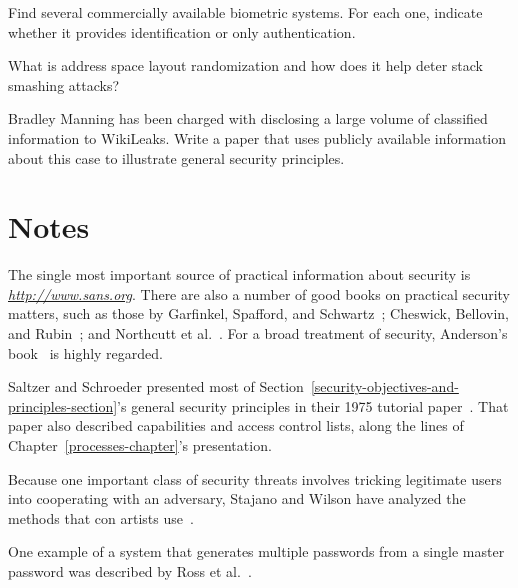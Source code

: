 \begin{chapterEnumerate}
\item
Find several commercially available biometric systems.  For each one, indicate whether it provides identification or only authentication.

\item
What is address space layout randomization and how does it help deter stack smashing attacks?

\item
Bradley Manning has been charged with disclosing a large volume of classified information to WikiLeaks. Write a paper that uses
publicly available information about this case to illustrate general security principles.

\end{chapterEnumerate}

\section*{Notes}

The single most important source of practical information about
security is \textit{\url{http://www.sans.org}}.  There
are also a number of good books on practical security matters, such as
those by Garfinkel, Spafford, and Schwartz~\cite{max1166}; Cheswick,
Bellovin, and Rubin~\cite{max1165}; and Northcutt et
  al.~\cite{max1167}.  For a broad treatment of security,
Anderson's book~\cite{max1195} is highly regarded.

Saltzer and Schroeder presented most of Section~\ref{security-objectives-and-principles-section}'s general security
principles in their 1975 tutorial paper~\cite{max1164}.  That
paper also described capabilities and access control lists, along the
lines of Chapter~\ref{processes-chapter}'s presentation.

Because one important class of security threats involves tricking legitimate users
into cooperating with an adversary, Stajano and Wilson have analyzed the methods
that con artists use~\cite{max1196,max1197}.

One example of a system that generates multiple passwords from a
single master password was described by Ross et al.~\cite{max1178}.


